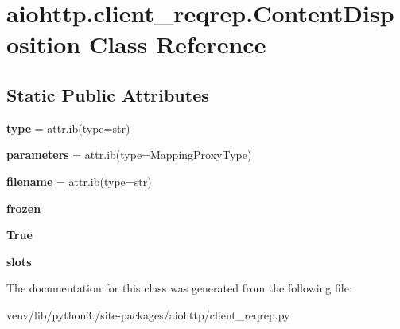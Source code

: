 \hypertarget{classaiohttp_1_1client__reqrep_1_1_content_disposition}{}\section{aiohttp.\+client\+\_\+reqrep.\+Content\+Disposition Class Reference}
\label{classaiohttp_1_1client__reqrep_1_1_content_disposition}
\subsection*{Static Public Attributes}
\begin{DoxyCompactItemize}
\item 
\mbox{\label{classaiohttp_1_1client__reqrep_1_1_content_disposition_ae38dea93ca3b3cbe4a98a02e67137080}} 
{\bfseries type} = attr.\+ib(type=str)
\item 
\mbox{\label{classaiohttp_1_1client__reqrep_1_1_content_disposition_a335f5e2a2f32593274e114fc299e39ed}} 
{\bfseries parameters} = attr.\+ib(type=Mapping\+Proxy\+Type)
\item 
\mbox{\label{classaiohttp_1_1client__reqrep_1_1_content_disposition_aa7c04dbcab5026663702eac79d3bfbcb}} 
{\bfseries filename} = attr.\+ib(type=str)
\item 
\mbox{\label{classaiohttp_1_1client__reqrep_1_1_content_disposition_a4a7bfe3a49776c173494a769c5942221}} 
{\bfseries frozen}
\item 
\mbox{\label{classaiohttp_1_1client__reqrep_1_1_content_disposition_ae368803842180dde4300aefc1c08f566}} 
{\bfseries True}
\item 
\mbox{\label{classaiohttp_1_1client__reqrep_1_1_content_disposition_a7656de6320c7b05f2bf7c2d03db58531}} 
{\bfseries slots}
\end{DoxyCompactItemize}


The documentation for this class was generated from the following file\+:\begin{DoxyCompactItemize}
\item 
venv/lib/python3./site-\/packages/aiohttp/client\+\_\+reqrep.\+py\end{DoxyCompactItemize}
